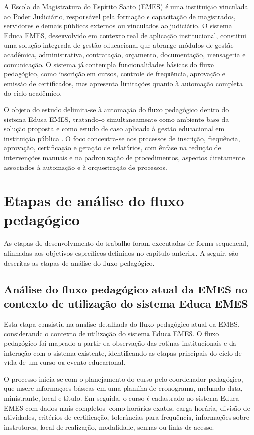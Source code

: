 A Escola da Magistratura do Espírito Santo (EMES) é uma instituição
vinculada ao Poder Judiciário, responsável pela formação e capacitação
de magistrados, servidores e demais públicos externos ou vinculados ao
judiciário. O sistema Educa EMES, desenvolvido em contexto real de
aplicação institucional, constitui uma solução integrada de gestão
educacional que abrange módulos de gestão acadêmica, administrativa,
contratação, orçamento, documentação, mensageria e comunicação. O
sistema já contempla funcionalidades básicas do fluxo pedagógico, como
inscrição em cursos, controle de frequência, aprovação e emissão de
certificados, mas apresenta limitações quanto à automação completa do
ciclo acadêmico.

O objeto do estudo delimita-se à automação do fluxo pedagógico dentro
do sistema Educa EMES, tratando-o simultaneamente como ambiente base da
solução proposta e como estudo de caso aplicado à gestão educacional em
instituição pública \cite{Yin2018}. O foco concentra-se nos processos de inscrição,
frequência, aprovação, certificação e geração de relatórios, com ênfase
na redução de intervenções manuais e na padronização de procedimentos,
aspectos diretamente associados à automação e à orquestração de
processos.

\section{Etapas de análise do fluxo pedagógico}
\label{sec:metod:etapas}

As etapas do desenvolvimento do trabalho foram executadas de forma
sequencial, alinhadas aos objetivos específicos definidos no capítulo
anterior. A seguir, são descritas as etapas de análise do fluxo
pedagógico.

\subsection{Análise do fluxo pedagógico atual da EMES no contexto de utilização do sistema Educa EMES}
\label{sec:metod:etapas:analise_fluxo}

Esta etapa consistiu na análise detalhada do fluxo pedagógico atual da
EMES, considerando o contexto de utilização do sistema Educa EMES. O
fluxo pedagógico foi mapeado a partir da observação das rotinas
institucionais e da interação com o sistema existente, identificando as
etapas principais do ciclo de vida de um curso ou evento educacional.

O processo inicia-se com o planejamento do curso pelo coordenador
pedagógico, que insere informações básicas em uma planilha de
cronograma, incluindo data, ministrante, local e título. Em seguida, o
curso é cadastrado no sistema Educa EMES com dados mais completos, como
horários exatos, carga horária, divisão de atividades, critérios de
certificação, tolerâncias para frequência, informações sobre
instrutores, local de realização, modalidade, senhas ou links de
acesso.

